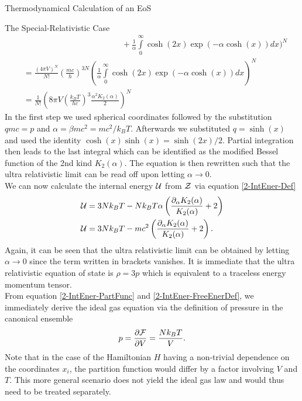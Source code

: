 \begin{section}{Thermodynamical Calculation of an EoS}
\begin{subsection}{The Special-Relativistic Case}
\begin{align}
		&\hspace{12em} + \frac{1}{\alpha}\int\limits_0^\infty\cosh(2x)\exp(-\alpha\cosh(x))dx  \Biggr)^N\\
		&= \frac{(4\pi V)^N}{N!}\left(\frac{mc}{h}\right)^{3N}\left(\frac{1}{\alpha}\int\limits_0^\infty\cosh(2x)\exp(-\alpha\cosh(x))dx  \right)^N\\
		&= \frac{1}{N!}\left(8\pi V\left(\frac{k_BT}{hc}\right)^{3}\frac{\alpha^2K_2(\alpha)}{2}\right)^N
		\label{2-IntEner-PartFunc}
\end{align}
In the first step we used spherical coordinates followed by the substitution $qmc=p$ and $\alpha=\beta mc^2=mc^2/k_BT$. Afterwards we substituted $q=\sinh(x)$ and used the identity $\cosh(x)\sinh(x)=\sinh(2x)/2$. Partial integration then leads to the last integral which can be identified \cite {abramowitzPocketbookMathematicalFunctions1984} as the modified Bessel function of the 2nd kind $K_2(\alpha)$. The equation is then rewritten such that the ultra relativistic limit can be read off upon letting $\alpha\rightarrow0$.\\
We can now calculate the internal energy $\mathcal{U}$ from $\mathcal{Z}$ via equation \eqref{2-IntEner-Def}
\begin{align}
    \mathcal{U} &= 3Nk_BT - Nk_BT\alpha\left(\frac{\partial_\alpha K_2(\alpha)}{K_2(\alpha)}+2\right)\\
    \mathcal{U} &= 3Nk_BT - mc^2\left(\frac{\partial_\alpha K_2(\alpha)}{K_2(\alpha)}+2\right).
    \label{2-IntEner-InternelEnergyExplicit}
\end{align}
Again, it can be seen that the ultra relativistic limit can be obtained by letting $\alpha\rightarrow0$ since the term written in brackets vanishes. 
It is immediate that the ultra relativistic equation of state is $\rho=3p$ which is equivalent to a traceless energy momentum tensor.\\
From equation \eqref{2-IntEner-PartFunc} and \eqref{2-IntEner-FreeEnerDef}, we immediately derive the ideal gas equation via the definition of pressure in the canonical ensemble
\begin{equation}
    p=\frac{\partial\mathcal{F}}{\partial V} = \frac{Nk_ BT}{V}.
    \label{2-IntEner-IdealGasEq}
\end{equation}
Note that in the case of the Hamiltonian $H$ having a non-trivial dependence on the coordinates $x_i$, the partition function would differ by a factor involving $V$ and $T$.
This more general scenario does not yield the ideal gas law and would thus need to be treated separately.
\end{subsection}

\end{section}
